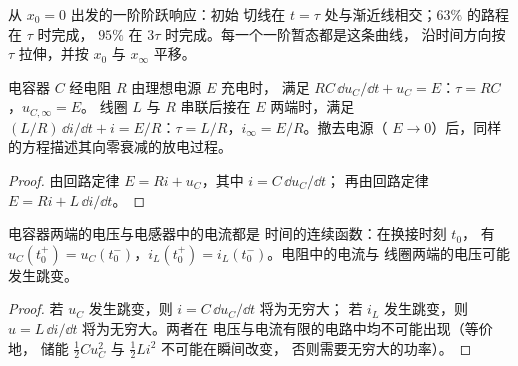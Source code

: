 \begin{omfigure}

{\small 从 $x_0 = 0$ 出发的一阶阶跃响应：初始
切线在 $t = \tau$ 处与渐近线相交；$63\%$ 的路程在 $\tau$ 时完成，
$95\%$ 在 $3\tau$ 时完成。每一个一阶暂态都是这条曲线，
沿时间方向按 $\tau$ 拉伸，并按 $x_0$ 与 $x_\infty$ 平移。}
\end{omfigure}

\begin{proposition}[RC 电路与 RL 电路]\label{prop:b1:transient-regimes:rcrl}
电容器 $C$ 经电阻 $R$ 由理想电源 $E$ 充电时，
满足 $RC\,\dd u_C/\dd t + u_C = E$：$\tau = RC$，$u_{C,\infty} = E$。
线圈 $L$ 与 $R$ 串联后接在 $E$ 两端时，满足 $(L/R)\,\dd i/\dd t + i =
E/R$：$\tau = L/R$，$i_\infty = E/R$。撤去电源（
$E \to 0$）后，同样的方程描述其向零衰减的放电过程。
\end{proposition}

\begin{proof}
由回路定律 $E = Ri + u_C$，其中 $i = C\,\dd u_C/\dd t$；
再由回路定律 $E = Ri + L\,\dd i/\dd t$。
\end{proof}

\begin{proposition}[连续性条件]\label{prop:b1:transient-regimes:continuity}
电容器两端的电压与电感器中的电流都是
时间的连续函数：在换接时刻 $t_0$，
有 $u_C(t_0^+) = u_C(t_0^-)$，$i_L(t_0^+) = i_L(t_0^-)$。电阻中的电流与
线圈两端的电压可能发生跳变。
\end{proposition}

\begin{proof}
若 $u_C$ 发生跳变，则 $i = C\,\dd u_C/\dd t$ 将为无穷大；
若 $i_L$ 发生跳变，则 $u = L\,\dd i/\dd t$ 将为无穷大。两者在
电压与电流有限的电路中均不可能出现（等价地，
储能 $\tfrac12 Cu_C^2$ 与 $\tfrac12 Li^2$ 不可能在瞬间改变，
否则需要无穷大的功率）。
\end{proof}

